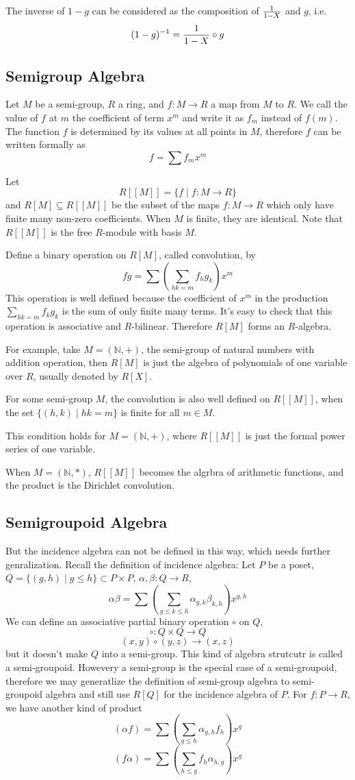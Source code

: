 \documentclass{article}
\begin{document}
The inverse of $1 - g$ can be considered as the composition of $1 \over 1 - X$ and $g$, i.e. $$(1 - g)^{-1} = {1 \over 1 - X} \circ g$$


\subsection{Semigroup Algebra}
Let $M$ be a semi-group, $R$ a ring, and $f : M \to R$ a map from $M$ to $R$.
We call the value of $f$ at $m$ the coefficient of term $x^m$ and write it as $f_m$ instead of $f(m)$.
The function $f$ is determined by its values at all points in $M$, therefore $f$ can be written
formally as $$f = \sum f_m x^m$$

Let $$R[[M]] = \{f \mid f : M \to R\}$$ and $R[M] \subseteq R[[M]]$ be the subset
of the maps $f : M \to R$ which only have finite many non-zero coefficients.
When $M$ is finite, they are identical.
Note that $R[[M]]$ is the free $R$-module with basis $M$.

Define a binary operation on $R[M]$, called convolution, by
$$fg = \sum (\sum_{hk = m} f_h g_k) x^m$$
This operation is well defined because the coefficient of $x^m$ in the production $\sum_{hk=m} f_k g_k$
is the sum of only finite many terms. It's easy to check that this operation is associative and $R$-bilinear.
Therefore $R[M]$ forms an $R$-algebra.

For example, take $M = (\mathbb N, +)$, the semi-group of natural numbers with addition operation,
then $R[M]$ is just the algebra of polynomials of one variable over $R$, usually denoted by $R[X]$.

For some semi-group $M$, the convolution is also well defined on $R[[M]]$,
when the set $\{(h, k) \mid hk = m\}$ is finite for all $m \in M$.

This condition holds for $M = (\mathbb N, +)$, where $R[[M]]$ is just the formal power series of one variable.

When $M = (\mathbb N, \ast)$, $R[[M]]$ becomes the algrbra of arithmetic functions,
and the product is the Dirichlet convolution.

\subsection{Semigroupoid Algebra}
But the incidence algebra can not be defined in this way, which needs further genralization.
Recall the definition of incidence algebra:
Let $P$ be a poset, $Q = \{(g, h) \mid g \leq h\} \subset P \times P$,
$\alpha, \beta : Q \to R$,
$$\alpha\beta = \sum (\sum_{g\leq k \leq h} \alpha_{g,k} \beta_{k,h})x^{g,h}$$
We can define an associative partial binary operation $\circ$ on $Q$,
$$\circ : Q \times Q \to Q$$
$$(x, y) \circ (y, z) \to (x, z)$$
but it doesn't make $Q$ into a semi-group.
This kind of algebra strutcutr is called a semi-groupoid.
Howevery a semi-group is the special case of a semi-groupoid,
therefore we may generatlize the definition of semi-group algebra
to semi-groupoid algebra and still use $R[Q]$ for the incidence algebra of $P$.
For $f : P \to R$, we have another kind of product
$$(\alpha f) = \sum (\sum_{g\leq h} \alpha_{g, h} f_h)x^g$$
$$(f \alpha) = \sum (\sum_{h\leq g} f_h \alpha_{h, g})x^g$$
\end{document}
